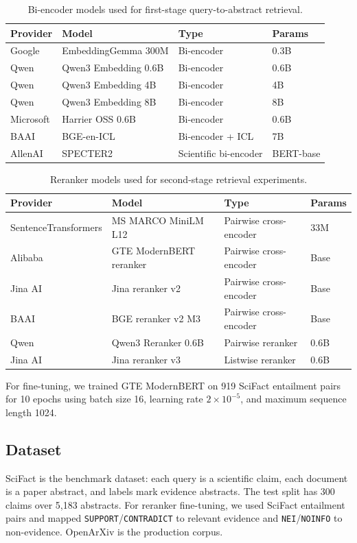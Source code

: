 \documentclass[11pt,a4paper]{article}
\begin{document}
\begin{table}[H]
\centering
\small
\begin{tabular}{llll}
\toprule
Provider & Model & Type & Params \\
\midrule
Google & EmbeddingGemma 300M & Bi-encoder & 0.3B \\
Qwen & Qwen3 Embedding 0.6B & Bi-encoder & 0.6B \\
Qwen & Qwen3 Embedding 4B & Bi-encoder & 4B \\
Qwen & Qwen3 Embedding 8B & Bi-encoder & 8B \\
Microsoft & Harrier OSS 0.6B & Bi-encoder & 0.6B \\
BAAI & BGE-en-ICL & Bi-encoder + ICL & 7B \\
AllenAI & SPECTER2 & Scientific bi-encoder & BERT-base \\
\bottomrule
\end{tabular}
\caption{Bi-encoder models used for first-stage query-to-abstract retrieval.}
\label{tab:biencoder-models}
\end{table}

\begin{table}[H]
\centering
\small
\begin{tabular}{llll}
\toprule
Provider & Model & Type & Params \\
\midrule
SentenceTransformers & MS MARCO MiniLM L12 & Pairwise cross-encoder & 33M \\
Alibaba & GTE ModernBERT reranker & Pairwise cross-encoder & Base \\
Jina AI & Jina reranker v2 & Pairwise cross-encoder & Base \\
BAAI & BGE reranker v2 M3 & Pairwise cross-encoder & Base \\
Qwen & Qwen3 Reranker 0.6B & Pairwise reranker & 0.6B \\
Jina AI & Jina reranker v3 & Listwise reranker & 0.6B \\
\bottomrule
\end{tabular}
\caption{Reranker models used for second-stage retrieval experiments.}
\label{tab:reranker-models}
\end{table}

For fine-tuning, we trained GTE ModernBERT on 919 SciFact entailment pairs for 10 epochs using batch size 16, learning rate $2 \times 10^{-5}$, and maximum sequence length 1024.

\subsection{Dataset}
SciFact is the benchmark dataset: each query is a scientific claim, each document is a paper abstract, and labels mark evidence abstracts. The test split has 300 claims over 5,183 abstracts. For reranker fine-tuning, we used SciFact entailment pairs and mapped \texttt{SUPPORT}/\texttt{CONTRADICT} to relevant evidence and \texttt{NEI}/\texttt{NOINFO} to non-evidence. OpenArXiv is the production corpus.
\end{document}
